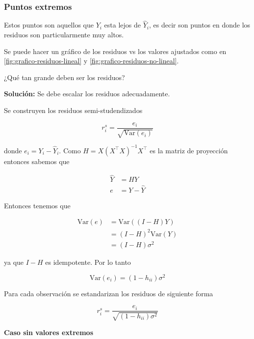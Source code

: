 \documentclass[
  12pt,
]{book}
\theoremstyle{definition}
\theoremstyle{definition}
\theoremstyle{definition}
\theoremstyle{definition}
\theoremstyle{remark}
\begin{document}
\hypertarget{puntos-extremos}{%
\subsubsection{Puntos extremos}\label{puntos-extremos}}

Estos puntos son aquellos que \(Y_i\) esta lejos de \(\hat{Y}_i\), es decir son puntos en donde los residuos son particularmente muy altos.

Se puede hacer un gráfico de los residuos vs los valores ajustados como en \ref{fig:grafico-residuos-lineal} y \ref{fig:grafico-residuos-no-lineal}.

¿Qué tan grande deben ser los residuos?

\textbf{Solución:} Se debe escalar los residuos adecuadamente.

Se construyen los residuos semi-studendizados

\begin{equation*}
r_{i}^{s} = \frac{e_{i}}{\sqrt{\mathrm{Var}\left(e_{i}\right)}} 
\end{equation*}

donde \(e_i=Y_i-\hat Y_i\). Como \(H=X(X^{\top}X)^{-1}X^{\top}\) es la matriz de proyección entonces sabemos que

\begin{align*}
\hat{Y}&=  H Y \\
e &= Y - \hat{Y}  
\end{align*}

Entonces tenemos que

\begin{align*}
\mathrm{Var}\left(e\right) 
&=  \mathrm{Var}\left((I-H)Y\right)\\
&= (I-H)^{2}\mathrm{Var}\left(Y\right)\\
&= (I-H) \sigma^{2} 
\end{align*}

ya que \(I-H\) es idempotente. Por lo tanto

\begin{equation*}
\mathrm{Var}\left(e_{i}\right) = (1-h_{ii}) \sigma^{2}
\end{equation*}

Para cada observación se estandarizan los residuos de siguiente forma

\begin{equation*}
r_{i}^{s} = \frac{e_i}{\sqrt{(1-h_{ii}) \sigma^{2}}}
\end{equation*}

\textbf{Caso sin valores extremos}
\end{document}
